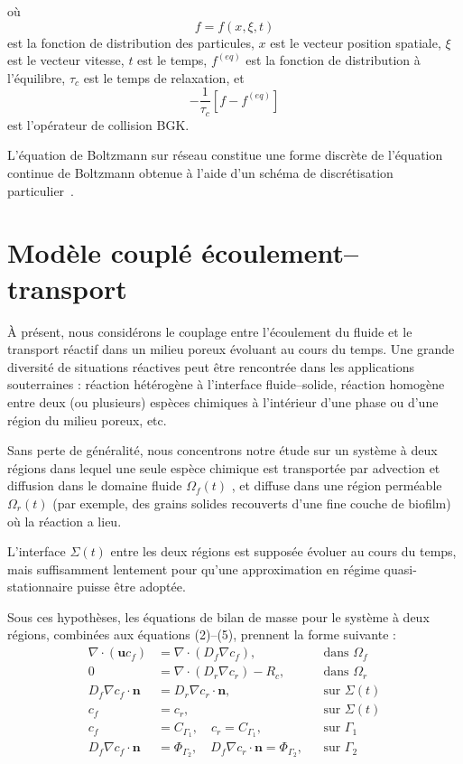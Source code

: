 \documentclass[12pt,a4paper]{report}
\begin{document}
où
\[
f=f(x,\xi,t)
\]
est la fonction de distribution des particules, $x$ est le vecteur position spatiale, $\xi$ est le vecteur vitesse, $t$ est le temps, $f^{(eq)}$ est la fonction de distribution à l’équilibre, $\tau_c$ est le temps de relaxation, et
\[
-\frac{1}{\tau_c}
\left[
f-f^{(eq)}
\right]
\]
est l’opérateur de collision BGK.

L’équation de Boltzmann sur réseau constitue une forme discrète de l’équation continue de Boltzmann obtenue à l’aide d’un schéma de discrétisation particulier~\cite{ref35}.
\section{Modèle couplé écoulement–transport}
À présent, nous considérons le couplage entre l’écoulement du fluide et le transport réactif dans un milieu poreux évoluant au cours du temps. Une grande diversité de situations réactives peut être rencontrée dans les applications souterraines : réaction hétérogène à l’interface fluide–solide, réaction homogène entre deux (ou plusieurs) espèces chimiques à l’intérieur d’une phase ou d’une région du milieu poreux, etc.

Sans perte de généralité, nous concentrons notre étude sur un système à deux régions dans lequel une seule espèce chimique est transportée par advection et diffusion dans le domaine fluide $\Omega_f(t)$ , et diffuse dans une région perméable $\Omega_r(t)$  (par exemple, des grains solides recouverts d’une fine couche de biofilm) où la réaction a lieu.

L’interface $\Sigma(t) $ entre les deux régions est supposée évoluer au cours du temps, mais suffisamment lentement pour qu’une approximation en régime quasi-stationnaire puisse être adoptée.

Sous ces hypothèses, les équations de bilan de masse pour le système à deux régions, combinées aux équations (2)–(5), prennent la forme suivante :
\begin{align}
\nabla \cdot (\mathbf{u}c_f) &= \nabla \cdot (D_f \nabla c_f), && \text{dans } \Omega_f \tag{36}\\
0 &= \nabla \cdot (D_r \nabla c_r) - R_c, && \text{dans } \Omega_r \tag{37}\\
D_f \nabla c_f \cdot \mathbf{n} &= D_r \nabla c_r \cdot \mathbf{n}, && \text{sur } \Sigma(t) \tag{38}\\
c_f &= c_r, && \text{sur } \Sigma(t) \tag{39}\\
c_f &= C_{\Gamma_1}, \quad c_r = C_{\Gamma_1}, && \text{sur } \Gamma_1 \tag{40}\\
D_f \nabla c_f \cdot \mathbf{n} &= \Phi_{\Gamma_2}, \quad D_f \nabla c_r \cdot \mathbf{n} = \Phi_{\Gamma_2}, && \text{sur } \Gamma_2 \tag{41}
\end{align}
\end{document}
